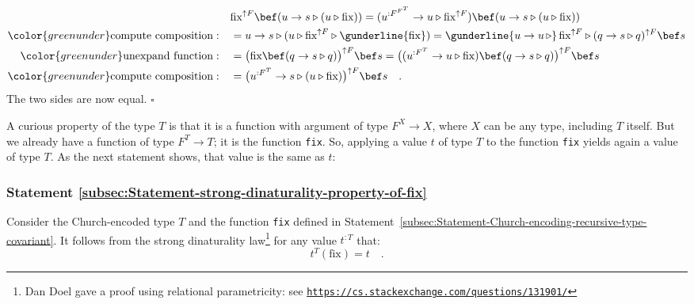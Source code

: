 \begin{align*}
 & \text{fix}^{\uparrow F}\bef(u\rightarrow s\triangleright(u\triangleright\text{fix}))=(u^{:F^{F^{T}}}\rightarrow u\triangleright\text{fix}^{\uparrow F})\bef(u\rightarrow s\triangleright(u\triangleright\text{fix}))\\
{\color{greenunder}\text{compute composition}:}\quad & =u\rightarrow s\triangleright(u\triangleright\text{fix}^{\uparrow F}\triangleright\gunderline{\text{fix}})=\gunderline{u\rightarrow u\,\triangleright}\,\text{fix}^{\uparrow F}\triangleright(q\rightarrow s\triangleright q)^{\uparrow F}\bef s\\
{\color{greenunder}\text{unexpand function}:}\quad & =\big(\text{fix}\bef(q\rightarrow s\triangleright q)\big)^{\uparrow F}\bef s=\big((u^{:F^{T}}\rightarrow u\triangleright\text{fix})\bef(q\rightarrow s\triangleright q)\big)^{\uparrow F}\bef s\\
{\color{greenunder}\text{compute composition}:}\quad & =\big(u^{:F^{T}}\rightarrow s\triangleright(u\triangleright\text{fix})\big)^{\uparrow F}\bef s\quad.
\end{align*}
The two sides are now equal. $\square$

A curious property of the type $T$ is that it is a function with
argument of type $F^{X}\rightarrow X$, where $X$ can be any type,
including $T$ itself. But we already have a function of type $F^{T}\rightarrow T$;
it is the function \lstinline!fix!.
So, applying a value $t$ of type $T$ to the function \lstinline!fix!
yields again a value of type $T$. As the next statement shows, that
value is the same as $t$:

\subsubsection{Statement \label{subsec:Statement-strong-dinaturality-property-of-fix}\ref{subsec:Statement-strong-dinaturality-property-of-fix}}

Consider the Church-encoded type $T$ and the function \lstinline!fix!
defined in Statement~\ref{subsec:Statement-Church-encoding-recursive-type-covariant}.
It follows from the strong dinaturality law\footnote{Dan Doel gave a proof using relational parametricity:
see \texttt{\href{https://cs.stackexchange.com/questions/131901/}{https://cs.stackexchange.com/questions/131901/}}} for any value $t^{:T}$ that:
\begin{equation}
t^{T}(\text{fix})=t\quad.\label{eq:fix-unfix-property-of-T}
\end{equation}


